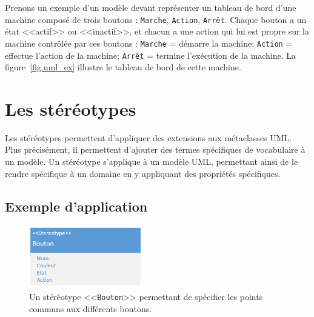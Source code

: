 Prenons un exemple d'un mod\`ele devant représenter un tableau de bord d'une machine composé de trois boutons : \texttt{Marche}, \texttt{Action}, \texttt{Arrêt}.
Chaque bouton a un état <<actif>> ou <<inactif>>, et
chacun a une action qui lui est propre sur la machine contr\^ol\'ee par ces boutons : \texttt{Marche} = démarre la machine; \texttt{Action} = effectue l'action de la machine; \texttt{Arrêt} = termine l'ex\'ecution de la machine.
%
La figure~\ref{fig.uml_ex} illustre le tableau de bord de cette machine.


\section{Les stéréotypes}
Les stéréotypes permettent d'appliquer des extensions aux métaclasses UML.
Plus pr\'ecis\'ement, il permettent d'ajouter des termes spécifiques de vocabulaire à un mod\`ele.
Un stéréotype s'applique à un mod\`ele UML, permettant ainsi de le rendre spécifique à un domaine en y appliquant des propriétés spécifiques.

\subsection{Exemple d'application}

\begin{figure}
    \begin{center}
    \includegraphics[width=5cm]{10_img/chap4/button.PNG}
    \caption{Un st\'er\'eotype <<\texttt{Bouton}>> permettant de sp\'ecifier les points communs aux diff\'erents boutons.}
    \label{fig.uml_but_definition}
    \end{center}
\end{figure}



